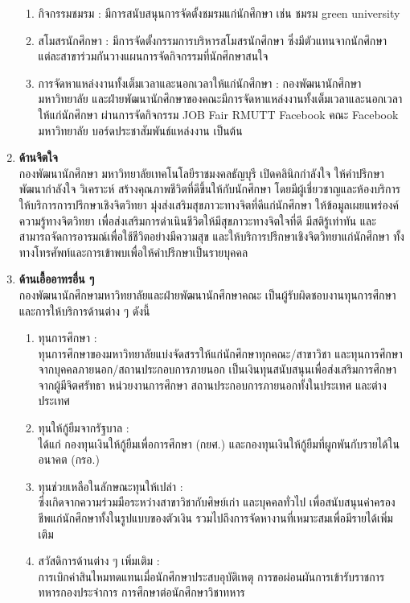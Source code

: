 \begin{enumerate}
\begin{enumerate}[label=(\arabic*), leftmargin=1cm]
\item กิจกรรมชมรม : มีการสนับสนุนการจัดตั้งชมรมแก่นักศึกษา เช่น ชมรม green university 
\item สโมสรนักศึกษา : มีการจัดตั้งกรรมการบริหารสโมสรนักศึกษา ซึ่งมีตัวแทนจากนักศึกษาแต่ละสาขาร่วมกันวางแผนการจัดกิจกรรมที่นักศึกษาสนใจ
\item การจัดหาแหล่งงานทั้งเต็มเวลาและนอกเวลาให้แก่นักศึกษา : กองพัฒนานักศึกษา มหาวิทยาลัย และฝ่ายพัฒนานักศึกษาของคณะมีการจัดหาแหล่งงานทั้งเต็มเวลาและนอกเวลาให้แก่นักศึกษา ผ่านการจัดกิจกรรม JOB Fair RMUTT  Facebook คณะ Facebook มหาวิทยาลัย บอร์ดประชาสัมพันธ์แหล่งงาน เป็นต้น
\end{enumerate}
\item {\bf ด้านจิตใจ }\\
กองพัฒนานักศึกษา มหาวิทยาลัยเทคโนโลยีราชมงคลธัญบุรี เปิดคลินิกกำลังใจ ให้คำปรึกษา พัฒนากำลังใจ วิเคราะห์ สร้างคุณภาพชีวิตที่ดีขึ้นให้กับนักศึกษา โดยมีผู้เชี่ยวชาญและห้องบริการให้บริการการปรึกษาเชิงจิตวิทยา มุ่งส่งเสริมสุขภาวะทางจิตที่ดีแก่นักศึกษา ให้ข้อมูลเผยแพร่องค์ความรู้ทางจิตวิทยา เพื่อส่งเสริมการดำเนินชีวิตให้มีสุขภาวะทางจิตใจที่ดี มีสติรู้เท่าทัน และสามารถจัดการอารมณ์เพื่อใช้ชีวิตอย่างมีความสุข และให้บริการปรึกษาเชิงจิตวิทยาแก่นักศึกษา ทั้งทางโทรศัพท์และการเข้าพบเพื่อให้คำปรึกษาเป็นรายบุคคล 
\item {\bf ด้านเอื้ออาทรอื่น ๆ }\\
กองพัฒนานักศึกษามหาวิทยาลัยและฝ่ายพัฒนานักศึกษาคณะ เป็นผู้รับผิดชอบงานทุนการศึกษา และการให้บริการด้านต่าง ๆ ดังนี้
\begin{enumerate}[label=(\arabic*), leftmargin=1cm]
\item ทุนการศึกษา :\\ทุนการศึกษาของมหาวิทยาลัยแบ่งจัดสรรให้แก่นักศึกษาทุกคณะ/สาขาวิชา และทุนการศึกษาจากบุคคลภายนอก/สถานประกอบการภายนอก เป็นเงินทุนสนับสนุนเพื่อส่งเสริมการศึกษาจากผู้มีจิตศรัทธา หน่วยงานการศึกษา สถานประกอบการภายนอกทั้งในประเทศ และต่างประเทศ
\item ทุนให้กู้ยืมจากรัฐบาล :  \\ได้แก่ กองทุนเงินให้กู้ยืมเพื่อการศึกษา (กยศ.) และกองทุนเงินให้กู้ยืมที่ผูกพันกับรายได้ในอนาคต (กรอ.)
\item ทุนช่วยเหลือในลักษณะทุนให้เปล่า : \\ซึ่งเกิดจากความร่วมมือระหว่างสาขาวิชากับศิษย์เก่า และบุคคลทั่วไป เพื่อสนับสนุนค่าครองชีพแก่นักศึกษาทั้งในรูปแบบของตัวเงิน รวมไปถึงการจัดหางานที่เหมาะสมเพื่อมีรายได้เพิ่มเติม
\item สวัสดิการด้านต่าง ๆ เพิ่มเติม : \\การเบิกค่าสินไหมทดแทนเมื่อนักศึกษาประสบอุบัติเหตุ การขอผ่อนผันการเข้ารับราชการทหารกองประจำการ การศึกษาต่อนักศึกษาวิชาทหาร
\end{enumerate}
\end{enumerate}

